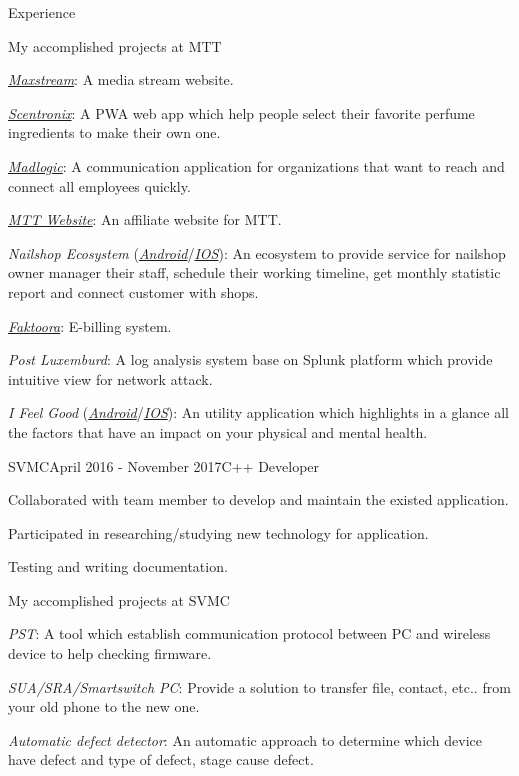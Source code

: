 \documentclass{resume}
\begin{document}
\begin{rSection}{Experience}
    \begin{rSubsection}{}{}{My accomplished projects at MTT}{}
      \item \href{https://maxstream.tv/}{\emph{Maxstream}}: A media stream website.
      \item \href{https://app.scnt.me/}{\emph{Scentronix}}: A PWA web app which help people select their favorite perfume ingredients to make their own one.
      \item \href{https://www.madlogic.nl/magic/}{\emph{Madlogic}}: A communication application for organizations that want to reach and connect all employees quickly.
      \item \href{https://mttjsc.com/}{\emph{MTT Website}}: An affiliate website for MTT.
      \item \emph{Nailshop Ecosystem} (\href{https://play.google.com/store/apps/developer?id=MTT+Software+Company+LTD/}{\emph{Android}}/\href{https://apps.apple.com/us/developer/mttjsc/id1250334932}{\emph{IOS}}): 
      An ecosystem to provide service for nailshop owner manager their
      staff, schedule their working timeline, get monthly statistic report and connect customer with shops.
      \item \href{http://app.faktoora.com}{\emph{Faktoora}}: E-billing system.
      \item \emph{Post Luxemburd}: A log analysis system base on Splunk platform which provide intuitive view for network attack.
      \item \emph{I Feel Good} (\href{https://play.google.com/store/apps/details?id=com.ifg_mobile}{\emph{Android}}/\href{}{\emph{IOS}}): 
      An utility application which highlights in a glance all the factors that have an impact on your physical and mental health.
    \end{rSubsection}
  
    \begin{rSubsection}{SVMC}{April 2016 - November 2017}{C++ Developer}{}
      \item Collaborated with team member to develop and maintain the existed application.
      \item Participated in researching/studying new technology for application.
      \item Testing and writing documentation.
    \end{rSubsection}

    \begin{rSubsection}{}{}{My accomplished projects at SVMC}{}
      \item \emph{PST}: A tool which establish communication protocol between PC and wireless device to help checking firmware.
      \item \emph{SUA/SRA/Smartswitch PC}: Provide a solution to transfer file, contact, etc.. from your old phone to the new one.
      \item \emph{Automatic defect detector}: An automatic approach to determine which device have defect and type of defect, stage cause defect.
    \end{rSubsection}
  
  \end{rSection}
\end{document}
